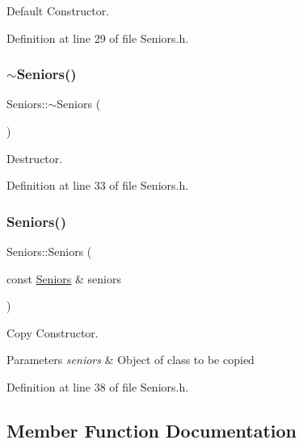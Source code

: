 Default Constructor. 



Definition at line 29 of file Seniors.\+h.

\hypertarget{class_seniors_a3063e1ce430ade54ec6b7a41a51bf942}{}\label{class_seniors_a3063e1ce430ade54ec6b7a41a51bf942} 
\subsubsection{\texorpdfstring{$\sim$\+Seniors()}{~Seniors()}}
{\footnotesize\ttfamily Seniors\+::$\sim$\+Seniors (\begin{DoxyParamCaption}{ }\end{DoxyParamCaption})\hspace{0.3cm}{\ttfamily [inline]}}



Destructor. 



Definition at line 33 of file Seniors.\+h.

\hypertarget{class_seniors_afb61156464d704b00aff866de6ee727a}{}\label{class_seniors_afb61156464d704b00aff866de6ee727a} 
\subsubsection{\texorpdfstring{Seniors()}{Seniors()}\hspace{0.1cm}{\footnotesize\ttfamily [2/2]}}
{\footnotesize\ttfamily Seniors\+::\+Seniors (\begin{DoxyParamCaption}\item[{const \hyperlink{class_seniors}{Seniors} \&}]{seniors }\end{DoxyParamCaption})\hspace{0.3cm}{\ttfamily [inline]}}



Copy Constructor. 


\begin{DoxyParams}{Parameters}
{\em seniors} & Object of class to be copied \\
\hline
\end{DoxyParams}


Definition at line 38 of file Seniors.\+h.



\subsection{Member Function Documentation}
\hypertarget{class_seniors_a4ee5683212625ee909b5c04d08bc8823}{}\label{class_seniors_a4ee5683212625ee909b5c04d08bc8823} 
